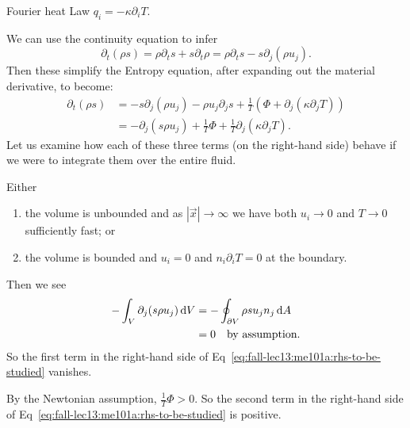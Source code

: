 \begin{assume}
Fourier heat Law $q_{i}=-\kappa\partial_{i}T$.
\end{assume}

\begin{node}
We can use the continuity equation to infer
\begin{equation}
\partial_{t}(\rho s) = \rho\partial_{t}s + s\partial_{t}\rho=\rho\partial_{t}s-s\partial_{j}(\rho u_{j}).
\end{equation}
Then these simplify the Entropy equation, after expanding out the material
derivative, to become:
\begin{subequations}
  \begin{align}
\partial_{t}(\rho s)
&=-s\partial_{j}(\rho u_{j})-\rho u_{j}\partial_{j}s + \frac{1}{T}(\Phi+\partial_{j}(\kappa\partial_{j}T))\\
&=-\partial_{j}(s\rho u_{j}) + \frac{1}{T}\Phi + \frac{1}{T}\partial_{j}(\kappa\partial_{j}T).\label{eq:fall-lec13:me101a:rhs-to-be-studied}
  \end{align}
\end{subequations}
Let us examine how each of these three terms (on the right-hand side)
behave if we were to integrate them over the entire fluid.
\end{node}

\begin{assume}
Either
\begin{enumerate}
\item the volume is unbounded and as $|\vec{x}|\to\infty$ we have
both $u_{i}\to0$ and $T\to0$ sufficiently fast; or
\item the volume is bounded and $u_{i}=0$ and $n_{i}\partial_{i}T=0$ at the boundary.
\end{enumerate}
\end{assume}

\begin{node}
Then we see
\begin{subequations}
  \begin{align}
-\int_{V}\partial_{j}(s\rho u_{j})\,\mathrm{d} V &= -\oint_{\partial V}\rho su_{j}n_{j}\,\mathrm{d} A\\
&=0\quad\mbox{by assumption}.
  \end{align}
\end{subequations}
So the first term in the right-hand side of Eq~\eqref{eq:fall-lec13:me101a:rhs-to-be-studied}
vanishes.
\end{node}

\begin{node}
By the Newtonian assumption, $\frac{1}{T}\Phi>0$. So the second term
in the right-hand side of Eq~\eqref{eq:fall-lec13:me101a:rhs-to-be-studied}
is positive.
\end{node}

